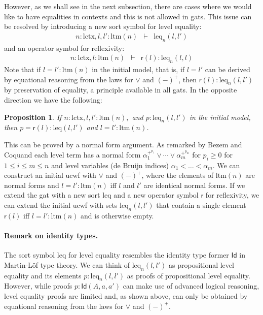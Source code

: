 \documentclass[11pt,a4paper]{article}
\theoremstyle{plain}
\newtheorem*{proposition*}{Proposition}%
\theoremstyle{definition}
\newcommand{\Id}{\mathsf{Id}}
\newcommand{\refl}{\mathsf{r}}
\def\lctx{\mathrm{lctx}}
\def\ltm{\mathrm{ltm}}
\def\leq{\mathrm{leq}}
\begin{document}
However, as we shall see in the next subsection, there are cases where we would like to have equalities in contexts and this is not allowed in gats. This issue can be resolved by introducing a new sort symbol for level equality:
\begin{eqnarray*}
n : \lctx, l, l'  : \ltm(n) &\vdash& \leq_n(l,l')
\end{eqnarray*}
and an operator symbol for reflexivity:
\begin{eqnarray*}
n : \lctx, l : \ltm(n) &\vdash& \refl(l) :  \leq_n(l,l)
\end{eqnarray*}
Note that if $l =  l' : \ltm(n)$ in the initial model, that is, if $l = l'$ can be derived by equational reasoning from the laws for $\vee$ and $(-)^+$, then $\refl(l) :  \leq_n(l,l')$
by preservation of equality, a principle available in all gats. In the opposite direction we have the following:
\begin{proposition*}
If $n : \lctx, l, l' : \ltm(n),$ and $p :  \leq_n(l,l')$ in the initial model, 
then $p = \refl(l) : \leq(l,l')$ and $l = l' : \ltm(n)$. 
\end{proposition*} 

This can be proved by a normal form argument. As remarked by Bezem and Coquand \cite{bezem-coquand:lattices}
each level term has a normal form 
$
\alpha_1^{+^{p_1}} \vee \cdots \vee \alpha_m^{+^{p_m}}
$ 
for $p_i \geq 0$ for $1 \le i \le m \le n$ and level variables (de Bruijn indices) $\alpha_1 < \ldots < \alpha_m$. 
We can construct an initial ucwf with $\vee$ and $(-)^+$, where the elements of $\ltm(n)$ are normal forms and $l = l' : \ltm(n)$ iff $l$ and $l'$ are identical normal forms.  If we extend the gat with a new sort $\leq$ and a new operator symbol $\refl$ for reflexivity, we can extend the initial ucwf with sets $\leq_n(l,l')$ that contain a single element $\refl(l)$ iff $l = l' : \ltm(n)$ and is otherwise empty.

\paragraph{Remark on identity types.} The sort symbol $\leq$ for level equality resembles the identity type former $\Id$ in Martin-Löf type theory. We can think of $\leq_n(l,l')$ as propositional level equality and its elements $p : \leq_n(l,l')$ as proofs of propositional level equality. However, while proofs $p : \Id(A,a,a')$ can make use of advanced logical reasoning, level equality proofs are limited and, as shown above, can only be obtained by equational reasoning from the laws for $\vee$ and $(-)^+$.
\end{document}

